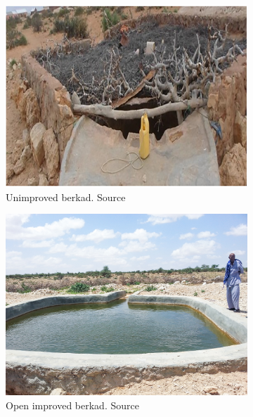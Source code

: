 \begin{figure}[!hbp]
    \centering
    \begin{subfigure}[t]{0.3\linewidth}
        \centering\includegraphics[width=0.95\linewidth]{figures/2023_MA_th_berkad_unimproved.PNG}
        \caption{Unimproved berkad. Source \textcite[5]{mafutaUniversalWASHCoverage2021}}
    \end{subfigure}
    \begin{subfigure}[t]{0.3\linewidth}
        \centering\includegraphics[width=0.95\linewidth]{figures/2023_MA_th_berkad_open.jpg}
        \caption{Open improved berkad. Source \textcite{lifeLIFEWorksLocal2017}}
    \end{subfigure}
    \begin{subfigure}[t]{0.3\linewidth}

\end{subfigure}
\end{figure}

